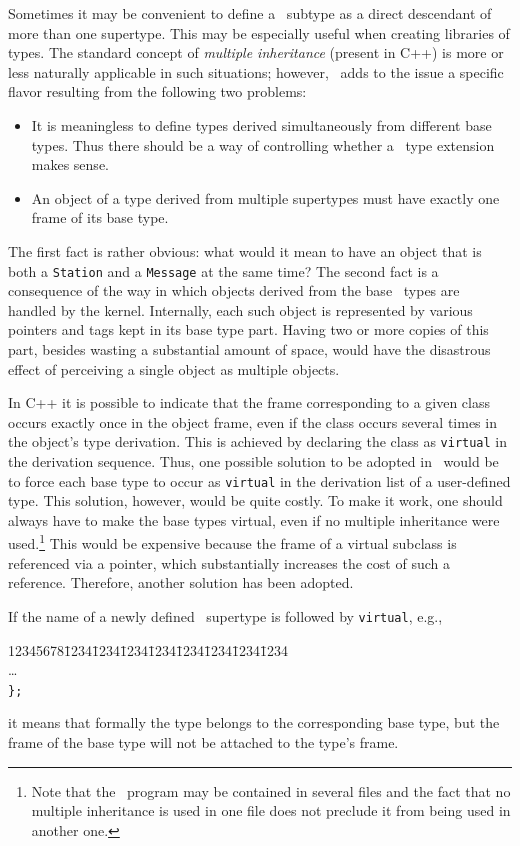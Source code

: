 Sometimes it may be convenient to define a \smurph\ subtype as a direct
descendant of more than one supertype.
This may be especially useful when creating libraries of types.
The standard concept of {\em multiple inheritance\/} (present in C++)
is more or less naturally applicable in such situations; however,
\smurph\ adds to the issue a specific flavor resulting from the
following two problems:
\begin{itemize}
\item
It is meaningless to define types derived simultaneously
from different base types.
Thus there should be a way of controlling whether a \smurph\ type extension
makes sense.
\item
An object of a type derived from multiple supertypes must have exactly one
frame of its base type.
\end{itemize}

The first fact is rather obvious: what would it mean to have an object that is
both a {\tt Station} and a {\tt Message} at the same time?
The second fact is a consequence of the way in which objects derived from the
base \smurph\ types are handled by the kernel.
Internally, each such object is represented by various pointers and tags
kept in its base type part.
Having two or more copies of this part, besides wasting a substantial amount of
space, would have the disastrous effect of
perceiving a single object as multiple objects.

In C++ it is possible to indicate that the frame corresponding to a given
class occurs exactly once in the object frame, even if the class occurs
several times in the object's type derivation.
This is achieved by declaring the class as {\tt virtual} in the derivation
sequence.
Thus, one possible solution to be adopted in \smurph\ would be to force
each base type to occur as {\tt virtual} in the derivation list of a
user-defined type.
This solution, however, would be quite costly.
To make it work, one should always have to make the base types virtual, even
if no multiple inheritance were used.\footnote {Note that the \smurph\ program
may be contained in several files and the fact that no multiple inheritance is
used in one file does not preclude it from being used in another one.}
This would be expensive because the frame of a virtual subclass is referenced
via a pointer, which substantially increases the cost of such a reference.
Therefore, another solution has been adopted.

If the name of a newly defined \smurph\ supertype is followed by
{\tt virtual}, e.g.,
{\tt\begin{tabbing}
12345678\=1234\=1234\=1234\=1234\=1234\=1234\=1234\=1234\kill
{}\\
\> \>\ldots \\
\> {\tt \};}
\end{tabbing}}
\noindent
it means that formally the type belongs to the corresponding base type,
but the frame of the base type will not be attached to the type's frame.

